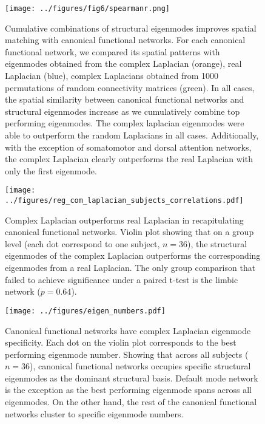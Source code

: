 \documentclass{article}
\begin{document}
\begin{figure}[ht]
\centering
\texttt{[image: ../figures/fig6/spearmanr.png]}
\caption{Cumulative combinations of structural eigenmodes improves spatial matching with canonical functional networks. For each canonical functional network, we compared its spatial patterns with eigenmodes obtained from the complex Laplacian (orange), real Laplacian (blue), complex Laplacians obtained from 1000 permutations of random connectivity matrices (green). In all cases, the spatial similarity between canonical functional networks and structural eigenmodes increase as we cumulatively combine top performing eigenmodes. The complex laplacian eigenmodes were able to outperform the random Laplacians in all cases. Additionally, with the exception of somatomotor and dorsal attention networks, the complex Laplacian clearly outperforms the real Laplacian with only the first eigenmode.}
\label{fig:fig5}
\end{figure}

\begin{figure}[ht]
\centering
\texttt{[image: ../figures/reg\_com\_laplacian\_subjects\_correlations.pdf]}
\caption{Complex Laplacian outperforms real Laplacian in recapitulating canonical functional networks. Violin plot showing that on a group level (each dot correspond to one subject, $n = 36$), the structural eigenmodes of the complex Laplacian outperforms the corresponding eigenmodes from a real Laplacian. The only group comparison that failed to achieve significance under a paired t-test is the limbic network ($p = 0.64$).}
\label{fig:fig6}
\end{figure}


\begin{figure}[ht]
\texttt{[image: ../figures/eigen\_numbers.pdf]}
\caption{Canonical functional networks have complex Laplacian eigenmode specificity. Each dot on the violin plot corresponds to the best performing eigenmode number. Showing that across all subjects ($n = 36$), canonical functional networks occupies specific structural eigenmodes as the dominant structural basis. Default mode network is the exception as the best performing eigenmode spans across all eigenmodes. On the other hand, the rest of the canonical functional networks cluster to specific eigenmode numbers.}
\label{fig:fig7}
\end{figure}
\end{document}
